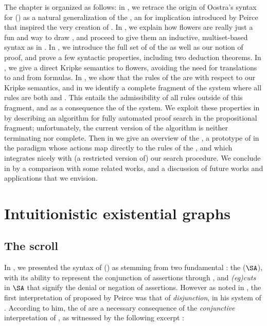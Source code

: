 \begin{scope}
The chapter is organized as follows: in , we retrace the origin of
Oostra's syntax for  ()
as a natural generalization of the \emph{}, an  for
implication introduced by Peirce that inspired the very creation of . In
, we explain how flowers are really just a fun and
 way to draw , and proceed to give them an inductive,
multiset-based syntax as in . In , we
introduce the full set of  of the  as
well as our notion of proof, and prove a few syntactic properties, including two
deduction theorems. In , we give a direct Kripke semantics to
flowers, avoiding the need for translations to and from formulas. In
, we show that the rules of the  are 
with respect to our Kripke semantics, and in  we identify a
complete fragment of the system where all rules are both \emph{}
and \emph{}. This entails the admissibility of all rules outside
of this fragment, and as a consequence the  of the system. We
exploit these properties in  by describing an algorithm
for fully automated proof search in the propositional fragment; unfortunately,
the current version of the algorithm is neither terminating nor complete. Then
in  we give an overview of the , a
prototype of  in the  paradigm whose actions map
directly to the rules of the , and which integrates nicely
with (a restricted version of) our search procedure. We conclude in
 by a comparison with some related works, and a discussion of
future works and applications that we envision.


\section{Intuitionistic existential graphs}

\subsection{The scroll}

In , we presented the syntax of  () as
stemming from two fundamental : the  ($\SA$),
with its ability to represent the conjunction of assertions through
\emph{}, and \emph{\kl(eg){cuts}} in $\SA$ that signify the denial or
negation of assertions. However as noted in , the first
interpretation of  proposed by Peirce was that of
\emph{disjunction}, in his system of . According to him,
the  of  are a necessary consequence of the
\emph{conjunctive} interpretation of , as witnessed by the
following excerpt :


\end{scope}
